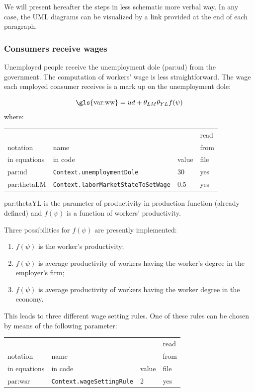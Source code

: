 \documentclass{book}
\begin{document}
We will present hereafter the steps in less schematic more verbal way. In any case, the UML diagrams can be visualized by a link provided at the end of each paragraph.

\subsubsection{Consumers receive wages}

Unemployed people receive the unemployment dole (\gls{par:ud}) from the government.
The computation of workers' wage is less straightforward. The wage each employed consumer receives is a mark up on the unemployment dole: 

\begin{equation}
	\textnormal{\gls{var:ww}}=ud+\theta_{LM}\theta_{YL}f(\psi)
	\label{eq:ww}
\end{equation}
where:\\

\vskip2mm
\noindent
\begin{tabular}{l l l l}
	\hline
	& &&read\\
	notation& name &&from\\
	in equations& in code&value&file\\
	\hline
	\hline
\gls{par:ud}&\verb+Context.unemploymentDole+&30&yes\\
\gls{par:thetaLM}&\verb+Context.laborMarketStateToSetWage+&0.5&yes\\
	\hline
\end{tabular}

\vskip2mm
\gls{par:thetaYL} is the parameter of productivity in production function (already defined) and $f(\psi)$ is a function of workers' productivity.

Three possibilities for $f(\psi)$ are presently implemented:
\begin{enumerate}
	\item $f(\psi)$ is the worker's productivity;
	\item $f(\psi)$ is average productivity of workers having the worker's degree in the employer's firm;
	\item $f(\psi)$ is average productivity of workers having the worker degree in the economy.
\end{enumerate}


This leads to three different wage setting rules. One of these rules can be chosen by means of the following parameter:\\
\vskip2mm
\noindent
\begin{tabular}{l l l l}
	\hline
	& &&read\\
	notation& name &&from\\
	in equations& in code&value&file\\
	\hline
	\hline
\gls{par:wsr}&\verb+Context.wageSettingRule+&2&yes\\
	\hline
\end{tabular}
\end{document}
